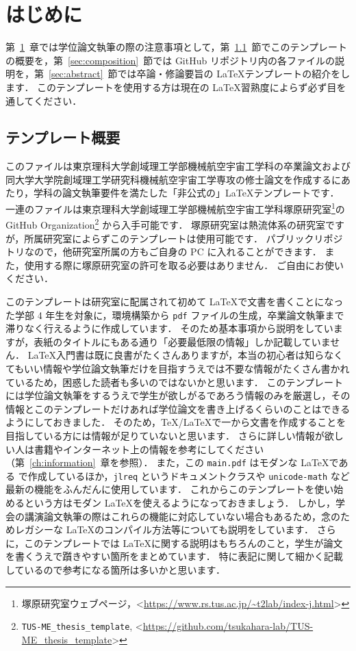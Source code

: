 \chapter{はじめに}
\label{ch:introduction}

第~\ref{ch:introduction}~章では学位論文執筆の際の注意事項として，第~\ref{sec:template}~節でこのテンプレートの概要を，第~\ref{sec:composition}~節では GitHub リポジトリ内の各ファイルの説明を，第~\ref{sec:abstract}~節では卒論・修論要旨の \LaTeX テンプレートの紹介をします．
このテンプレートを使用する方は現在の \LaTeX 習熟度によらず必ず目を通してください．

\section{テンプレート概要}
\label{sec:template}

このファイルは東京理科大学創域理工学部機械航空宇宙工学科の卒業論文および同大学大学院創域理工学研究科機械航空宇宙工学専攻の修士論文を作成するにあたり，学科の論文執筆要件を満たした「非公式の」\LaTeX テンプレートです．
一連のファイルは東京理科大学創域理工学部機械航空宇宙工学科塚原研究室\footnote{塚原研究室ウェブページ，\textless\url{https://www.rs.tus.ac.jp/~t2lab/index-j.html}\textgreater}の GitHub Organization\footnote{\texttt{TUS-ME\_thesis\_template}, \textless\url{https://github.com/tsukahara-lab/TUS-ME_thesis_template}\textgreater} から入手可能です．
塚原研究室は熱流体系の研究室ですが，所属研究室によらずこのテンプレートは使用可能です．
パブリックリポジトリなので，他研究室所属の方もご自身の PC に入れることができます．
また，使用する際に塚原研究室の許可を取る必要はありません．
ご自由にお使いください．

このテンプレートは研究室に配属されて初めて \LaTeX で文書を書くことになった学部 4 年生を対象に，環境構築から \verb|pdf| ファイルの生成，卒業論文執筆まで滞りなく行えるように作成しています．
そのため基本事項から説明をしていますが，表紙のタイトルにもある通り「必要最低限の情報」しか記載していません．
\LaTeX 入門書は既に良書がたくさんありますが，本当の初心者は知らなくてもいい情報や学位論文執筆だけを目指すうえでは不要な情報がたくさん書かれているため，困惑した読者も多いのではないかと思います．
このテンプレートには学位論文執筆をするうえで学生が欲しがるであろう情報のみを厳選し，その情報とこのテンプレートだけあれば学位論文を書き上げるくらいのことはできるようにしておきました．
そのため，\TeX/\LaTeX で一から文書を作成することを目指している方には情報が足りていないと思います．
さらに詳しい情報が欲しい人は書籍やインターネット上の情報を参考にしてください（第~\ref{ch:information}~章を参照）．
また，この \verb|main.pdf| はモダンな \LaTeX である \LuaLaTeX で作成しているほか，\verb|jlreq| というドキュメントクラスや \verb|unicode-math| など最新の機能をふんだんに使用しています．
これからこのテンプレートを使い始めるという方はモダン \LaTeX を使えるようになっておきましょう．
しかし，学会の講演論文執筆の際はこれらの機能に対応していない場合もあるため，念のためレガシーな \LaTeX のコンパイル方法等についても説明をしています．
さらに，このテンプレートでは \LaTeX に関する説明はもちろんのこと，学生が論文を書くうえで躓きやすい箇所をまとめています．
特に表記に関して細かく記載しているので参考になる箇所は多いかと思います．

